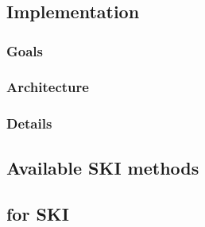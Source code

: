 
\chapter[Platform for symbolic knowledge injection]{}
\label{ch:psyki}
\minitoc

\section{Implementation}\label{sec:implementation}

\subsection{Goals}\label{subsec:goals}

\subsection{Architecture}\label{subsec:architecture}

\subsection{Details}\label{subsec:details}

\section{Available \Gls{SKI} methods}\label{sec:available-ski-methods}

\subsection{}\label{subsec:kbann}

\subsection{}\label{subsec:kins}

\subsection{}\label{subsec:kill}

\section{ for \Gls{SKI}}\label{sec:qos}


